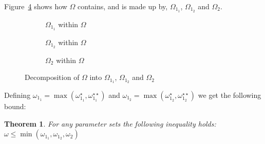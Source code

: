 \documentclass{article}
\newtheorem{theorem}{Theorem}
\begin{document}
Figure~\ref{fig:decomposeqnet} shows how $\Omega$ contains, and is made up by, $\Omega_{1_1}$, $\Omega_{1_2}$ and $\Omega_2$.

\begin{figure}[!htbp]
\begin{subfigure}[b]{0.5\textwidth}
  
  \caption{$\Omega_{1_1}$ within $\Omega$}
  \label{fig:omega11withinomega}
\end{subfigure}
\begin{subfigure}[b]{0.5\textwidth}
  
  \caption{$\Omega_{1_2}$ within $\Omega$}
  \label{fig:omega12withinomega}
\end{subfigure}
\begin{center}
\begin{subfigure}[b]{0.5\textwidth}
  
  \caption{$\Omega_2$ within $\Omega$}
  \label{fig:omega2withinomega}
\end{subfigure}
\end{center}
\caption{Decomposition of $\Omega$ into $\Omega_{1_1}$, $\Omega_{1_2}$ and $\Omega_2$}
\label{fig:decomposeqnet}
\end{figure}

Defining $\omega_{1_1} = \max(\omega_{1_1}^{\star}, \omega_{1_1}^{\star\star})$ and $\omega_{1_2} = \max(\omega_{1_2}^{\star}, \omega_{1_2}^{\star\star})$ we get the following bound:\\

\begin{theorem}
For any parameter sets the following inequality holds:
$\omega \leq \min(\omega_{1_1}, \omega_{1_2}, \omega_2)$
\end{theorem}
\end{document}

